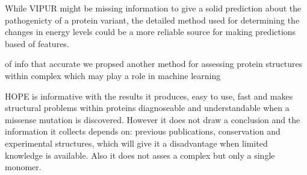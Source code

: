 While VIPUR might be missing information to give a solid prediction about the pathogenicty of a protein variant, the detailed method used for determining the changes in energy levels could be a more reliable source for making predictions based of features.

 of info that accurate we propsed another method for assessing protein structures within complex which may play a role in machine learning
 
 HOPE is informative with the results it produces, easy to use, fast and makes structural problems within proteins diagnoseable and understandable when a missense mutation is discovered. However it does not draw a conclusion and the information it collects depends on: previous publications, conservation and experimental structures, which will give it a disadvantage when limited knowledge is available. Also it does not asses a complex but only a single monomer.

